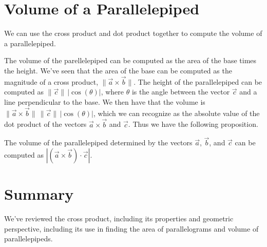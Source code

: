 \documentclass{ximera}
\begin{document}
\section{Volume of a Parallelepiped}

We can use the cross product and dot product together to compute the volume of a parallelepiped.

\begin{image}
\end{image}

The volume of the parellelepiped can be computed as the area of the base times the height. We've seen that the area of the base can be computed as the magnitude of a cross product, $\|\vec{a}\times\vec{b}\|$. The height of the parallelepiped can be computed as $\|\vec{c}\|\,|\cos(\theta)|$, where $\theta$ is the angle between the vector $\vec{c}$ and a line perpendicular to the base. We then have that the volume is $\|\vec{a}\times\vec{b}\|\,\|\vec{c}\|\,|\cos(\theta)|$, which we can recognize as the absolute value of the dot product of the vectors $\vec{a}\times\vec{b}$ and $\vec{c}$. Thus we have the following proposition.

\begin{proposition}
The volume of the parallelepiped determined by the vectors $\vec{a}$, $\vec{b}$, and $\vec{c}$ can be computed as $|(\vec{a}\times\vec{b})\cdot\vec{c}|$.
\end{proposition}

\section{Summary}

We've reviewed the cross product, including its properties and geometric perspective, including its use in finding the area of parallelograms and volume of parallelepipeds.
\end{document}
